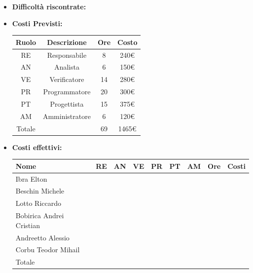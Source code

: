 \begin{itemize}
\begin{itemize}
            \end{itemize}
            \item \textbf{Difficoltà riscontrate:}
            \item \textbf{Costi Previsti:}
            \begin{longtable}{|c|c|c|c|}
                \hline
                Ruolo & Descrizione & Ore & Costo \\
                \hline
                RE & Responsabile & 8 &  240€\\
                \hline
                AN & Analista & 6 &  150€\\
                \hline
                VE & Verificatore & 14 &  280€\\
                \hline
                PR & Programmatore & 20 & 300€ \\
                \hline
                PT & Progettista & 15 & 375€ \\
                \hline
                AM & Amministratore & 6 &  120€\\
                \hline
                Totale & & 69 & 1465€ \\
                \hline
                \end{longtable}
            \item \textbf{Costi effettivi:}
            \begin{longtable}{|p{}|c|c|c|c|c|c|c|c|}
                \hline
                Nome & RE & AN & VE & PR & PT & AM & Ore & Costi\\
                \hline
                Ibra \newline Elton & & & & & & & & \\
                \hline
                Beschin Michele & & & & & & & & \\
                \hline
                Lotto \newline Riccardo & & & & & & & & \\
                \hline
                Bobirica Andrei Cristian & & & & & & & & \\
                \hline
                Andreetto Alessio & & & & & & & & \\
                \hline
                Corbu Teodor Mihail & & & & & & & & \\
                \hline
                Totale & & & & & & & & \\
                \hline
            \end{longtable}
            \end{itemize}


